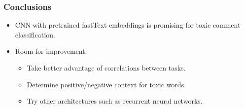 \documentclass{beamer}
\begin{document}
\begin{frame}
\frametitle{Conclusions}
\begin{itemize}
\item CNN with pretrained fastText embeddings is promising for toxic comment classification.
\item Room for improvement:
\begin{itemize}
\item Take better advantage of correlations between tasks.
\item Determine positive/negative context for toxic words.
\item Try other architectures such as recurrent neural networks.
\end{itemize}
\end{itemize}
\end{frame}
\end{document}
